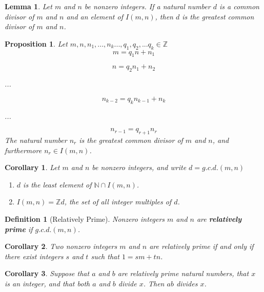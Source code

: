 \documentclass[12pt]{article}
\newtheorem{definition}{Definition}[subsection]
\newtheorem{proposition}{Proposition}[subsection]
\newtheorem{lemma}{Lemma}[subsection]
\newtheorem{corollary}{Corollary}[subsection]
\begin{document}
    \begin{lemma}
        Let $m$ and $n$ be nonzero integers. If a natural number $d$ is a common divisor of $m$ and $n$ and an element of $I(m,n)$, then $d$ is the greatest common divisor of $m$ and $n$.
    \end{lemma}
    \begin{proposition}
        Let $m,n,n_1,...,n_k...,q_1,q_2,...q_k \in \mathbb{Z}$\\
        \begin{equation}
            m = q_1n+n_1
        \end{equation}
        
        \begin{equation}
            n = q_2n_1+n_2
        \end{equation}
        \centerline{...}
        \begin{equation}
            n_{k-2} = q_kn_{k-1}+n_k
        \end{equation}
        \centerline{...}
        \begin{equation}
            n_{r-1}=q_{r+1}n_r
        \end{equation}
        The natural number $n_r$ is the greatest common divisor of $m$ and $n$, and furthermore $n_r \in I(m, n)$.
    \end{proposition}
    \begin{corollary}
        Let $m$ and $n$ be nonzero integers, and write $d= g.c.d.(m,n)$
        \begin{enumerate}
            \item $d$ is the least element of $\mathbb{N} \cap I(m,n)$.
            \item $I(m,n) = \mathbb{Z}d$, the set of all integer multiples of $d$.
        \end{enumerate}
   \end{corollary}
    \begin{definition}[Relatively Prime]
        Nonzero integers $m$ and $n$ are \textbf{relatively prime} if $g.c.d.(m,n)$.
    \end{definition}
    \begin{corollary}
        Two nonzero integers $m$ and $n$ are relatively prime if and only if there exist integers $s$ and $t$ such that $1=sm+tn$.
    \end{corollary}
    \begin{corollary}
        Suppose that $a$ and $b$ are relatively prime natural numbers, that $x$ is an integer, and that both $a$ and $b$ divide $x$. Then $ab$ divides $x$.
    \end{corollary}
    
\end{document}
